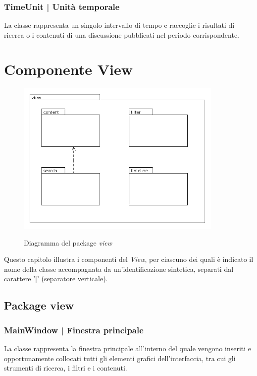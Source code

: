 \documentclass[10pt,a4paper,headinclude,footinclude,hidelinks]{scrreprt} %
\begin{document}
	\subsection[TimeUnit]{TimeUnit | Unità temporale}
	\label{sec:stage:design:model.timeline:time-unit}
	La classe \textit{} rappresenta un singolo intervallo di tempo e raccoglie i risultati di ricerca o i contenuti di una discussione pubblicati nel periodo corrispondente.

	\chapter{Componente View}
	\label{ch:stage:design:view}

	\begin{figure}[ht]
		\begin{center}
	    	\includegraphics[width=10cm]{package/view.png}
			\label{gfx:package:view}
			\caption{Diagramma del package \textit{view}}
		\end{center}
	\end{figure}

	Questo capitolo illustra i componenti del \textit{View}, per ciascuno dei quali è indicato il nome della classe accompagnata da un'identificazione sintetica, separati dal carattere '|' (separatore verticale).

	\section{Package view}
	\label{sec:stage:design:view}
	
	\subsection[MainWindow]{MainWindow | Finestra principale}
	\label{sec:stage:design:view:window}
	La classe \textit{} rappresenta la finestra principale all'interno del quale vengono inseriti e opportunamente collocati tutti gli elementi grafici dell'interfaccia, tra cui gli strumenti di ricerca, i filtri e i contenuti.
\end{document}
